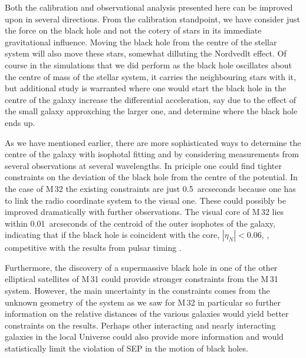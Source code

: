 \documentclass[useAMS,usenatbib]{mn2e}
\begin{document}
Both the calibration and observational analysis presented here can be
improved upon in several directions.  From the calibration standpoint,
we have consider just the force on the black hole and not the cotery
of stars in its immediate gravitational influence.  Moving the black
hole from the centre of the stellar system will also move these stars,
somewhat dilluting the Nordvedlt effect.  Of course in the simulations
that we did perform as the black hole oscillates about the centre of
mass of the stellar system, it carries the neighbouring stars with it,
but additional study is warranted where one would start the black hole
in the centre of the galaxy increase the differential acceleration,
say due to the effect of the small galaxy approxching the larger one,
and determine where the black hole ends up.

As we have mentioned earlier, there are more sophisticated ways to
determine the centre of the galaxy with isophotal fitting and by
considering measurements from several observations at several
wavelengths.  In priciple one could find tighter constraints on the
deviation of the black hole from the centre of the potential.  In the
case of M\,32 the existing constraints are just 0.5~arcseconds because
one has to link the radio coordinate system to the visual one.  These
could possibly be improved dramatically with further observations.
The visual core of M\,32 lies within 0.01~arcseconds of the centroid
of the outer isophotes of the galaxy, indicating that if the black
hole is coincident with the core, $|\eta_N|<0.06$, , competitive with the
results from pulsar timing \citep{Stairs:2005}.

Furthermore, the discovery of a supermassive black hole in one of the
other elliptical satellites of M\,31 could provide stronger
constraints from the M\,31 system.  However, the main uncertainty in
the constraints comes from the unknown geometry of the system as we
saw for M\,32 in particular so further information on the relative
distances of the various galaxies would yield better constraints on
the results.  Perhaps other interacting and nearly interacting
galaxies in the local Universe could also provide more information and
would statistically limit the violation of SEP in the motion of black
holes.
\end{document}
